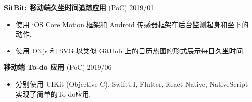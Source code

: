 \documentclass[10.5pt]{article}
\begin{document}
\textbf{SitBit: 移动端久坐时间追踪应用} (PoC) \hfill 2019/01
\begin{itemize}
\item 使用 iOS Core Motion 框架和 Android 传感器框架在后台监测起身和坐下的动作.
\item 使用 D3.js 和 SVG 以类似 GitHub 上的日历热图的形式展示每日久坐时间.
\end{itemize}

\textbf{移动端 To-do 应用} (PoC) \hfill 2019/06
\begin{itemize}
\item 分别使用 UIKit (Objective-C), SwiftUI, Flutter, React Native, NativeScript 实现了简单的To-do应用.
\end{itemize}
\end{document}
